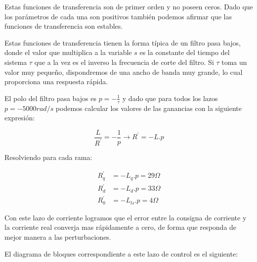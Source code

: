 \documentclass{article}
\begin{document}
Estas funciones de transferencia son de primer orden y no poseen ceros. Dado que
los parámetros de cada una son positivos también podemos afirmar que las funciones de 
transferencia son estables.

Estas funciones de transferencia tienen la forma típica de un filtro pasa bajos, donde el valor que
multiplica a la variable $s$ es la constante del tiempo del sistema $\tau$ que a la vez es el inverso
la frecuencia de corte del filtro. Si $\tau$ toma un valor muy pequeño, dispondremos de una ancho de 
banda muy grande, lo cual proporciona una respuesta rápida.

El polo del filtro pasa bajos es $p = -\frac{1}{\tau}$ y dado que para todos los lazos $p = -5000 rad/s$
podemos calcular los valores de las ganancias con la siguiente expresión:

\begin{equation}
    \frac{L}{R^\prime} = -\frac{1}{p} \to R^\prime = -L.p
\end{equation}

Resolviendo para cada rama:

\begin{align*}
    R_q^\prime &= -L_q.p = 29\varOmega  \\
    R_d^\prime &= -L_d.p = 33\varOmega \\
    R_0^\prime &= -L_{ls}.p = 4\varOmega
\end{align*}

Con este lazo de corriente logramos que el error entre la consigna de corriente y la corriente real
converja mas rápidamente a cero, de forma que responda de mejor manera a las perturbaciones.

El diagrama de bloques correspondiente a este lazo de control es el siguiente:
\end{document}

